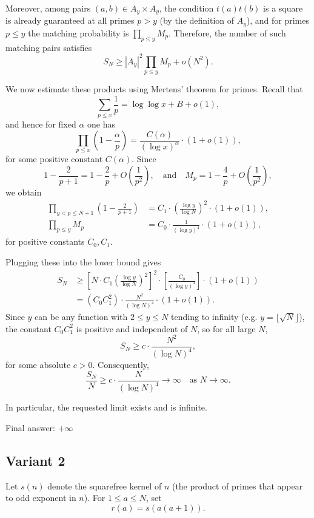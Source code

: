 \documentclass[12pt,a4paper]{article}
\theoremstyle{definition}
\begin{document}
    Moreover, among pairs $(a,b) \in A_y \times A_y$, the condition $t(a)t(b)$ is a square is already guaranteed at all primes $p > y$ (by the definition of $A_y$), and for primes $p \leq y$ the matching probability is $\prod_{p \leq y} M_p$. Therefore, the number of such matching pairs satisfies
    $$S_N \geq |A_y|^2 \prod_{p \leq y} M_p + o(N^2).$$

    We now estimate these products using Mertens' theorem for primes. Recall that
    $$\sum_{p \leq x} \frac{1}{p} = \log \log x + B + o(1),$$
    and hence for fixed $\alpha$ one has
    $$\prod_{p \leq x} \left(1 - \frac{\alpha}{p}\right) = \frac{C(\alpha)}{(\log x)^\alpha} \cdot (1 + o(1)),$$
    for some positive constant $C(\alpha)$. Since
    $$1 - \frac{2}{p+1} = 1 - \frac{2}{p} + O\left(\frac{1}{p^2}\right), \quad \text{and} \quad M_p = 1 - \frac{4}{p} + O\left(\frac{1}{p^2}\right),$$
    we obtain
    \begin{align}
        \prod_{y < p \leq N+1} \left(1 - \frac{2}{p+1}\right) &= C_1 \cdot \left(\frac{\log y}{\log N}\right)^2 \cdot (1 + o(1)),\\
        \prod_{p \leq y} M_p &= C_0 \cdot \frac{1}{(\log y)^4} \cdot (1 + o(1)),
    \end{align}
    for positive constants $C_0, C_1$.

    Plugging these into the lower bound gives
    \begin{align}
        S_N &\geq \left[N \cdot C_1 \left(\frac{\log y}{\log N}\right)^2\right]^2 \cdot \left[\frac{C_0}{(\log y)^4}\right] \cdot (1 + o(1))\\
        &= (C_0 C_1^2) \cdot \frac{N^2}{(\log N)^4} \cdot (1 + o(1)).
    \end{align}
    Since $y$ can be any function with $2 \leq y \leq N$ tending to infinity (e.g. $y = \lfloor\sqrt{N}\rfloor$), the constant $C_0 C_1^2$ is positive and independent of $N$, so for all large $N$,
    $$S_N \geq c \cdot \frac{N^2}{(\log N)^4},$$
    for some absolute $c > 0$. Consequently,
    $$\frac{S_N}{N} \geq c \cdot \frac{N}{(\log N)^4} \to \infty \quad \text{as } N \to \infty.$$

    In particular, the requested limit exists and is infinite.

    Final answer: $+\infty$
    \subsection{Variant 2}
    Let $s(n)$ denote the squarefree kernel of $n$ (the product of primes that appear to odd exponent in $n$). For $1 \leq a \leq N$, set
    $$r(a) = s(a(a+1)).$$
\end{document}
